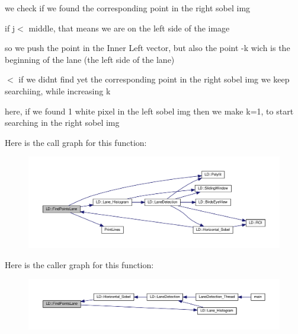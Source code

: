 we check if we found the corresponding point in the right sobel img

if j$<$ middle, that means we are on the left side of the image

so we push the point in the Inner Left vector, but also the point -\/k wich is the beginning of the lane (the left side of the lane)

$<$ if we didnt find yet the corresponding point in the right sobel img we keep searchiing, while increasing k

here, if we found 1 white pixel in the left sobel img then we make k=1, to start searching in the right sobel img 

Here is the call graph for this function\+:\nopagebreak
\begin{figure}[H]
\begin{center}
\leavevmode
\includegraphics[width=350pt]{namespaceLD_a57364c31ed52bfa2b19a53ba9a6034f5_cgraph}
\end{center}
\end{figure}




Here is the caller graph for this function\+:\nopagebreak
\begin{figure}[H]
\begin{center}
\leavevmode
\includegraphics[width=350pt]{namespaceLD_a57364c31ed52bfa2b19a53ba9a6034f5_icgraph}
\end{center}
\end{figure}


